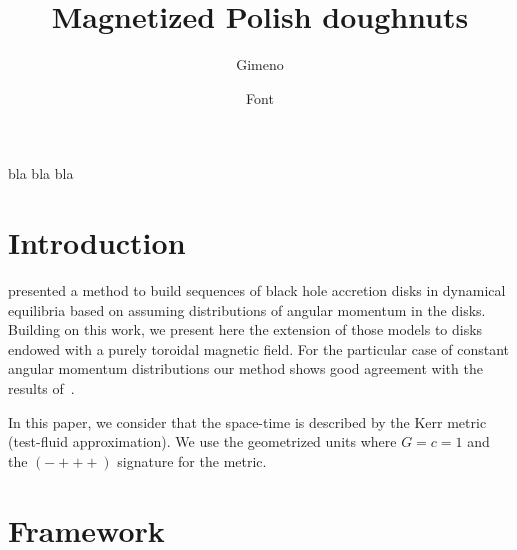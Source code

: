 \documentclass{aa}
\begin{document}
 


   \title{Magnetized Polish doughnuts}


   \author{Gimeno
          \and
          Font
          }


   \date{}

 
  \abstract
   {}
   {bla}
   {bla}
   {bla}
   {}


   \maketitle
%

\section{Introduction}


\citet{Qian:2009} presented a method to build sequences of black hole accretion disks in dynamical equilibria based on
assuming distributions of angular momentum in the disks. Building on this work, we present here the extension of those
models to disks endowed with a purely toroidal magnetic field. For the particular case of constant angular momentum
distributions our method shows good agreement with the results of~\citet{Komissarov:2006}.

In this paper, we consider that the space-time is described by the Kerr metric (test-fluid approximation). We use the geometrized units where $G = c = 1$ and the $(-+++)$ signature for the metric.

\section{Framework}
\end{document}
